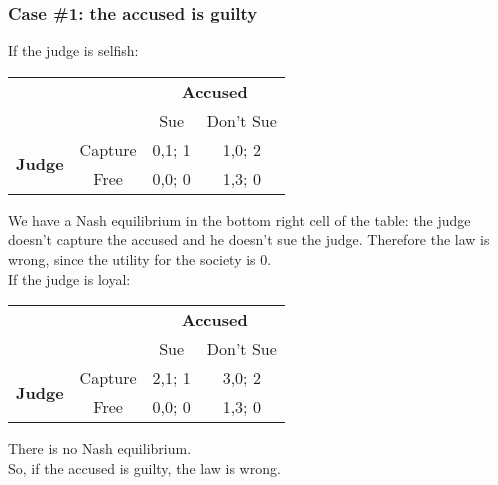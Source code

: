 \documentclass{article}
\begin{document}
\subsubsection{Case \#1: the accused is guilty}
If the judge is selfish:
\begin{center}
\begin{tabular}{cccc}
                                                     &                              & \multicolumn{2}{c}{\textbf{Accused}}                         \\ \cline{3-4} 
                                                     & \multicolumn{1}{c|}{}        & \multicolumn{1}{c|}{Sue}    & \multicolumn{1}{c|}{Don't Sue} \\ \cline{2-4} 
\multicolumn{1}{c|}{\multirow{2}{*}{\textbf{Judge}}} & \multicolumn{1}{c|}{Capture} & \multicolumn{1}{c|}{0,1; 1} & \multicolumn{1}{c|}{1,0; 2}    \\ \cline{2-4} 
\multicolumn{1}{c|}{}                                & \multicolumn{1}{c|}{Free}    & \multicolumn{1}{c|}{0,0; 0} & \multicolumn{1}{c|}{1,3; 0}    \\ \cline{2-4} 
\end{tabular}
\end{center}
We have a Nash equilibrium in the bottom right cell of the table: the judge doesn't capture the accused and he doesn't sue the judge. Therefore the law is wrong, since the utility for the society is $0$.\\
If the judge is loyal:
\begin{center}
\begin{tabular}{cccc}
                                                     &                              & \multicolumn{2}{c}{\textbf{Accused}}                         \\ \cline{3-4} 
                                                     & \multicolumn{1}{c|}{}        & \multicolumn{1}{c|}{Sue}    & \multicolumn{1}{c|}{Don't Sue} \\ \cline{2-4} 
\multicolumn{1}{c|}{\multirow{2}{*}{\textbf{Judge}}} & \multicolumn{1}{c|}{Capture} & \multicolumn{1}{c|}{2,1; 1} & \multicolumn{1}{c|}{3,0; 2}    \\ \cline{2-4} 
\multicolumn{1}{c|}{}                                & \multicolumn{1}{c|}{Free}    & \multicolumn{1}{c|}{0,0; 0} & \multicolumn{1}{c|}{1,3; 0}    \\ \cline{2-4} 
\end{tabular}
\end{center}
There is no Nash equilibrium.\\
So, if the accused is guilty, the law is wrong.
\end{document}
